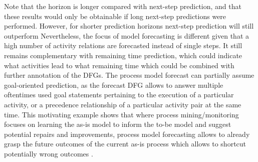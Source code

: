 Note that the horizon is longer compared with next-step prediction, and that these results would only be obtainable if long next-step predictions were performed.
However, for shorter prediction horizons next-step prediction will still outperform 
Nevertheless, the focus of model forecasting is different given that a high number of activity relations are forecasted instead of single steps.
It still remains complementary with remaining time prediction, which could indicate what activities lead to what remaining time which could be combined with further annotation of the DFGs.
The process model forecast can partially assume goal-oriented prediction, as the forecast DFG allows to answer multiple oftentimes used goal statements pertaining to the execution of a particular activity, or a precedence relationship of a particular activity pair \cite{DBLP:journals/tkdd/TeinemaaDRM19} at the same time.
This motivating example shows that where process mining/monitoring focuses on learning the as-is model to inform the to-be model and suggest potential repairs and improvements, process model forecasting allows to already grasp the future outcomes of the current as-is process which allows to shortcut potentially wrong outcomes \cite{DBLP:conf/bpm/PollPRRR18}.
